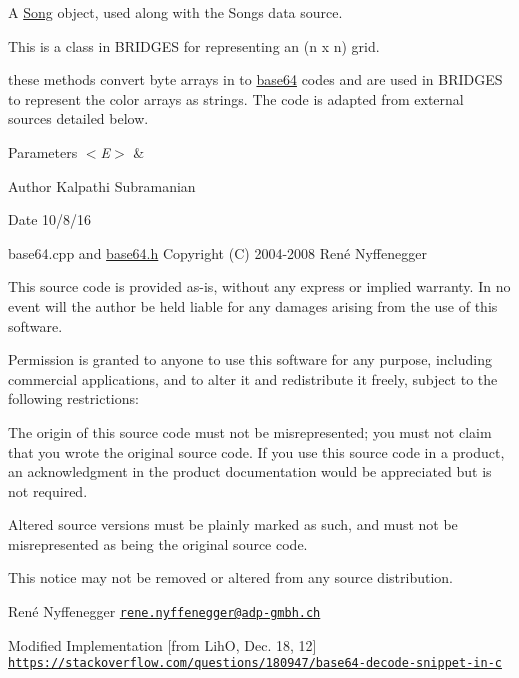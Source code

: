 A \mbox{\hyperlink{classbridges_1_1_song}{Song}} object, used along with the Songs data source.

This is a class in B\+R\+I\+D\+G\+ES for representing an (n x n) grid.

these methods convert byte arrays in to \mbox{\hyperlink{namespacebridges_1_1base64}{base64}} codes and are used in B\+R\+I\+D\+G\+ES to represent the color arrays as strings. The code is adapted from external sources detailed below.


\begin{DoxyParams}{Parameters}
{\em $<$\+E$>$} & \\
\hline
\end{DoxyParams}
\begin{DoxyAuthor}{Author}
Kalpathi Subramanian 
\end{DoxyAuthor}
\begin{DoxyDate}{Date}
10/8/16
\end{DoxyDate}
base64.\+cpp and \mbox{\hyperlink{base64_8h}{base64.\+h}} Copyright (C) 2004-\/2008 René Nyffenegger

This source code is provided \textquotesingle{}as-\/is\textquotesingle{}, without any express or implied warranty. In no event will the author be held liable for any damages arising from the use of this software.

Permission is granted to anyone to use this software for any purpose, including commercial applications, and to alter it and redistribute it freely, subject to the following restrictions\+:


\begin{DoxyEnumerate}
\item The origin of this source code must not be misrepresented; you must not claim that you wrote the original source code. If you use this source code in a product, an acknowledgment in the product documentation would be appreciated but is not required.
\begin{DoxyEnumerate}
\item Altered source versions must be plainly marked as such, and must not be misrepresented as being the original source code.
\item This notice may not be removed or altered from any source distribution.
\end{DoxyEnumerate}

René Nyffenegger \href{mailto:rene.nyffenegger@adp-gmbh.ch}{\tt rene.\+nyffenegger@adp-\/gmbh.\+ch}

Modified Implementation \mbox{[}from LihO, Dec. 18, 12\mbox{]} \href{https://stackoverflow.com/questions/180947/base64-decode-snippet-in-c}{\tt https\+://stackoverflow.\+com/questions/180947/base64-\/decode-\/snippet-\/in-\/c}
\end{DoxyEnumerate}

